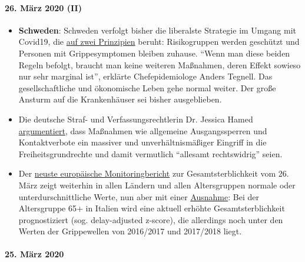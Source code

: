 \hypertarget{26-muxe4rz-2020-ii}{%
\paragraph{26. März 2020 (II)}\label{26-muxe4rz-2020-ii}}

\begin{itemize}
\tightlist
\item
  \textbf{Schweden}: Schweden verfolgt bisher die liberalste Strategie
  im Umgang mit Covid19, die
  \href{https://www.zeit.de/politik/ausland/2020-03/coronavirus-schweden-stockholm-oeffentliches-leben/komplettansicht}{auf
  zwei Prinzipien} beruht: Risikogruppen werden geschützt und Personen
  mit Grippesymptomen bleiben zuhause. ``Wenn man diese beiden Regeln
  befolgt, braucht man keine weiteren Maßnahmen, deren Effekt sowieso
  nur sehr marginal ist'', erklärte Chefepidemiologe Anders Tegnell. Das
  gesellschaftliche und ökonomische Leben gehe normal weiter. Der große
  Ansturm auf die Krankenhäuser sei bisher ausgeblieben.
\item
  Die deutsche Straf- und Verfassungsrechtlerin Dr. Jessica Hamed
  \href{https://www.fr.de/politik/coronakrise-deutschland-sind-kontaktsperren-ausgangsbeschraenkungen-rechtswidrig-13611821.html}{argumentiert},
  dass Maßnahmen wie allgemeine Ausgangssperren und Kontaktverbote ein
  massiver und unverhältnismäßiger Eingriff in die Freiheitsgrundrechte
  und damit vermutlich ``allesamt rechtswidrig'' seien.
\item
  Der \href{https://www.euromomo.eu/index.html}{neuste europäische
  Monitoringbericht} zur Gesamtsterblichkeit vom 26. März zeigt
  weiterhin in allen Ländern und allen Altersgruppen normale oder
  unterdurschnittliche Werte, nun aber mit einer
  \href{https://www.euromomo.eu/outputs/zscore_country65.html}{Ausnahme}:
  Bei der Altersgruppe 65+ in Italien wird eine aktuell erhöhte
  Gesamtsterblichkeit prognostiziert (sog. delay-adjusted z-score), die
  allerdings noch unter den Werten der Grippewellen von 2016/2017 und
  2017/2018 liegt.
\end{itemize}

\hypertarget{25-muxe4rz-2020}{%
\paragraph{25. März 2020}\label{25-muxe4rz-2020}}

